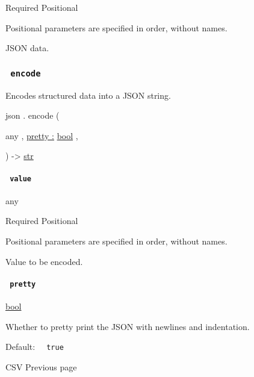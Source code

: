 {Required} {{ Positional }}

\label{definitions-decode-data-positional-tooltip}
Positional parameters are specified in order, without names.

JSON data.

\subsubsection{\texorpdfstring{\texttt{\ encode\ }}{ encode }}\label{definitions-encode}

Encodes structured data into a JSON string.

json { . } { encode } (

{ { any } , } { \hyperref[definitions-encode-parameters-pretty]{pretty
:} \href{/docs/reference/foundations/bool/}{bool} , }

) -\textgreater{} \href{/docs/reference/foundations/str/}{str}

\paragraph{\texorpdfstring{\texttt{\ value\ }}{ value }}\label{definitions-encode-value}

{ any }

{Required} {{ Positional }}

\label{definitions-encode-value-positional-tooltip}
Positional parameters are specified in order, without names.

Value to be encoded.

\paragraph{\texorpdfstring{\texttt{\ pretty\ }}{ pretty }}\label{definitions-encode-pretty}

\href{/docs/reference/foundations/bool/}{bool}

Whether to pretty print the JSON with newlines and indentation.

Default: \texttt{\ }{\texttt{\ true\ }}\texttt{\ }

\href{/docs/reference/data-loading/csv/}{\pandocbounded{}}

{ CSV } { Previous page }

\href{/docs/reference/data-loading/read/}{\pandocbounded{}}

